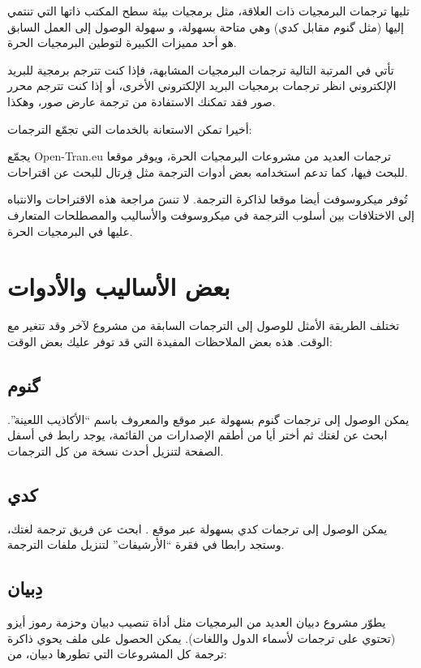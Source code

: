 تليها ترجمات البرمجيات ذات العلاقة، مثل برمجيات بيئة سطح المكتب ذاتها
التي تنتمي إليها (مثل گنوم مقابل كدي) وهي متاحة بسهولة، و سهولة الوصول
إلى العمل السابق هو أحد مميزات الكبيرة لتوطين البرمجيات الحرة.

تأتي في المرتبة التالية ترجمات البرمجيات المشابهة، فإذا كنت تترجم برمجية
للبريد الإلكتروني انظر ترجمات برمجيات البريد الإلكتروني الأخرى، أو إذا
كنت تترجم محرر صور فقد تمكنك الاستفادة من ترجمة عارض صور، وهكذا.

أخيرا تمكن الاستعانة بالخدمات التي تجمّع الترجمات:

\startitemize[1]
\item يجمّع Open-Tran.eu ترجمات العديد من مشروعات البرمجيات الحرة، ويوفر
موقعا للبحث فيها، كما تدعم استخدامه بعض أدوات الترجمة مثل فِرتال للبحث
عن اقتراحات.

\item تُوفر ميكروسوفت أيضا موقعا لذاكرة الترجمة. لا تنسَ مراجعة هذه
الاقتراحات والانتباه إلى الاختلافات بين أسلوب الترجمة في ميكروسوفت
والأساليب والمصطلحات المتعارف عليها في البرمجيات الحرة.

\stopitemize
\section{بعض الأساليب والأدوات}
تختلف الطريقة الأمثل للوصول إلى الترجمات السابقة من مشروع لآخر وقد تتغير
مع الوقت. هذه بعض الملاحظات المفيدة التي قد توفر عليك بعض الوقت:

\subsection{گنوم}
يمكن الوصول إلى ترجمات گنوم بسهولة عبر موقع
 والمعروف باسم
“الأكاذيب اللعينة”. ابحث عن لغتك ثم أختر أيا من أطقم الإصدارات من
القائمة، يوجد رابط في أسفل الصفحة لتنزيل أحدث نسخة من كل الترجمات.

\subsection{كدي}
يمكن الوصول إلى ترجمات كدي بسهولة عبر موقع .
ابحث عن فريق ترجمة لغتك، وستجد رابطا في فقرة “الأرشيفات” لتنزيل ملفات
الترجمة.

\subsection{دِبيان}
يطوّر مشروع دبيان العديد من البرمجيات مثل أداة تنصيب دبيان وحزمة رموز
أيزو (تحتوي على ترجمات لأسماء الدول واللغات). يمكن الحصول على ملف يحوي
ذاكرة ترجمة كل المشروعات التي تطورها دبيان، من:

